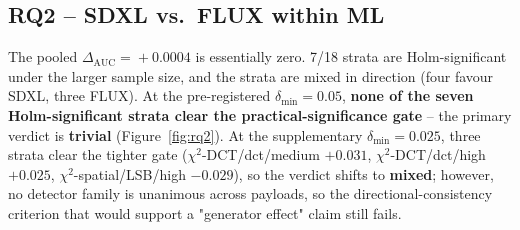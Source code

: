 \documentclass[10pt,twocolumn,a4paper]{article}
\begin{document}
\subsection{RQ2 -- SDXL vs.\ FLUX within ML}

The pooled $\Delta_\text{AUC}\!=\!+0.0004$ is essentially zero. 7/18 strata are Holm-significant under the larger sample size, and the strata are mixed in direction (four favour SDXL, three FLUX). At the pre-registered $\delta_\text{min}\!=\!0.05$, \textbf{none of the seven Holm-significant strata clear the practical-significance gate} -- the primary verdict is \textbf{trivial} (Figure~\ref{fig:rq2}). At the supplementary $\delta_\text{min}\!=\!0.025$, three strata clear the tighter gate ($\chi^2$-DCT/dct/medium $+0.031$, $\chi^2$-DCT/dct/high $+0.025$, $\chi^2$-spatial/LSB/high $-0.029$), so the verdict shifts to \textbf{mixed}; however, no detector family is unanimous across payloads, so the directional-consistency criterion that would support a "generator effect" claim still fails.
\end{document}
